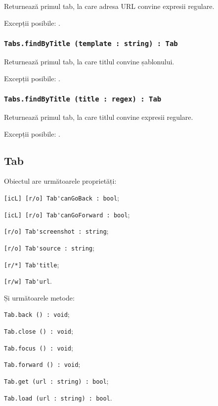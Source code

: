 Returnează primul tab, la care adresa URL convine expresii regulare.

Excepții posibile: .

\subsubsection{\lstinline|Tabs.findByTitle (template : string) : Tab|}

Returnează primul tab, la care titlul convine șablonului.

Excepții posibile: .

\subsubsection{\lstinline|Tabs.findByTitle (title : regex) : Tab|}

Returnează primul tab, la care titlul convine expresii regulare.

Excepții posibile: .

\subsection{{\color{orange} Tab}}

Obiectul \tab{} are următoarele proprietăți:
\begin{icItems}
	\item \lstinline|[icL] [r/o] Tab'canGoBack : bool|;
	\item \lstinline|[icL] [r/o] Tab'canGoForward : bool|;
	\item \lstinline|[r/o] Tab'screenshot : string|;
	\item \lstinline|[r/o] Tab'source : string|;
	\item \lstinline|[r/*] Tab'title|;
	\item \lstinline|[r/w] Tab'url|.
\end{icItems}

Și următoarele metode:
\begin{icItems}
	\item \lstinline|Tab.back () : void|;
	\item \lstinline|Tab.close () : void|;
	\item \lstinline|Tab.focus () : void|;
	\item \lstinline|Tab.forward () : void|;
	\item \lstinline|Tab.get (url : string) : bool|;
	\item \lstinline|Tab.load (url : string) : bool|.
\end{icItems}

